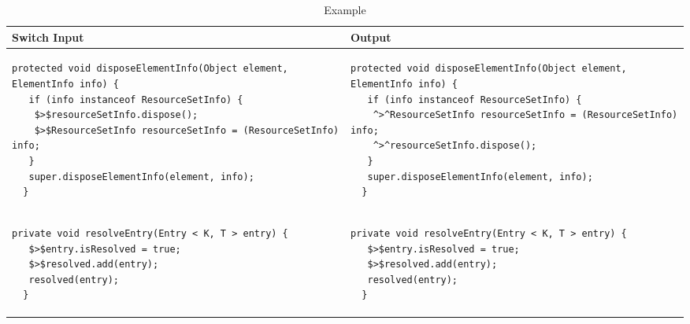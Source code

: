 \begin{landscape}
\begin{table}[p]
\begin{tabular}{ | m{10cm} | m{10cm} | }
  \hline
  Switch Input & Output \\
  \hline
  {\begin{lstlisting}[style=table]
  protected void disposeElementInfo(Object element, ElementInfo info) {
   if (info instanceof ResourceSetInfo) {
    $>$resourceSetInfo.dispose();
    $>$ResourceSetInfo resourceSetInfo = (ResourceSetInfo) info;
   }
   super.disposeElementInfo(element, info);
  }
  \end{lstlisting}} &
  {\begin{lstlisting}[style=table]
  protected void disposeElementInfo(Object element, ElementInfo info) {
   if (info instanceof ResourceSetInfo) {
    ^>^ResourceSetInfo resourceSetInfo = (ResourceSetInfo) info;
    ^>^resourceSetInfo.dispose();
   }
   super.disposeElementInfo(element, info);
  }
  \end{lstlisting}} \\
  \hline
  {\begin{lstlisting}[style=table]
  private void resolveEntry(Entry < K, T > entry) {
   $>$entry.isResolved = true;
   $>$resolved.add(entry);
   resolved(entry);
  }
  \end{lstlisting}} &
  {\begin{lstlisting}[style=table]
  private void resolveEntry(Entry < K, T > entry) {
   $>$entry.isResolved = true;
   $>$resolved.add(entry);
   resolved(entry);
  }
  \end{lstlisting}} \\
  \hline
\end{tabular}
\caption{Example}
\label{switch_showcase_table}
\end{table}
\end{landscape}
\clearpage
